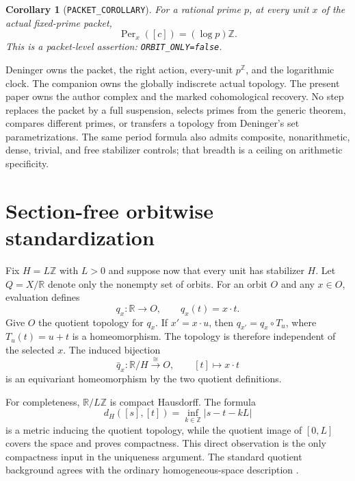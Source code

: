\documentclass[11pt]{article}
\newtheorem{corollary}[theorem]{Corollary}
\theoremstyle{definition}
\newcommand{\R}{\mathbb R}
\newcommand{\Z}{\mathbb Z}
\newcommand{\Per}{\operatorname{Per}}
\begin{document}
\begin{corollary}[\texttt{PACKET\_COROLLARY}]
\label{cor:packet-period}
For a rational prime $p$, at every unit $x$ of the actual fixed-prime packet,
\begin{equation}
\label{eq:packet-period}
 \Per_x([c])=(\log p)\Z.
\end{equation}
This is a packet-level assertion: \texttt{ORBIT\_ONLY=false}.
\end{corollary}

Deninger owns the packet, the right action, every-unit $p^{\Z}$, and the
logarithmic clock.  The companion owns the globally indiscrete actual
topology.  The present paper owns the author complex and the marked
cohomological recovery.  No step replaces the packet by a full suspension,
selects primes from the generic theorem, compares different primes, or
transfers a topology from Deninger's set parametrizations.  The same period
formula also admits composite, nonarithmetic, dense, trivial, and free
stabilizer controls; that breadth is a ceiling on arithmetic specificity.

\section{Section-free orbitwise standardization}
\label{sec:standardization}

Fix $H=L\Z$ with $L>0$ and suppose now that every unit has stabilizer $H$.
Let $Q=X/\R$ denote only the nonempty set of orbits.  For an orbit $O$ and
any $x\in O$, evaluation defines
\begin{equation}
\label{eq:quotient-chart}
 q_x:\R\longrightarrow O,\qquad q_x(t)=x\mathbin{\cdot}t.
\end{equation}
Give $O$ the quotient topology for $q_x$.  If
$x'=x\mathbin{\cdot}u$, then $q_{x'}=q_x\circ T_u$, where
$T_u(t)=u+t$ is a homeomorphism.  The topology is therefore independent of
the selected $x$.  The induced bijection
\begin{equation}
\label{eq:standard-orbit-chart}
 \bar q_x:\R/H\xrightarrow{\ \cong\ }O,\qquad
 [t]\longmapsto x\mathbin{\cdot}t
\end{equation}
is an equivariant homeomorphism by the two quotient definitions.

For completeness, $\R/L\Z$ is compact Hausdorff.  The formula
\begin{equation}
\label{eq:quotient-metric}
 d_H([s],[t])=\inf_{k\in\Z}|s-t-kL|
\end{equation}
is a metric inducing the quotient topology, while the quotient image of
$[0,L]$ covers the space and proves compactness.  This direct observation is
the only compactness input in the uniqueness argument.  The standard
quotient background agrees with the ordinary homogeneous-space description
\cite{EoMTopologicalGroup,EoMHomogeneousSpace}.
\end{document}

